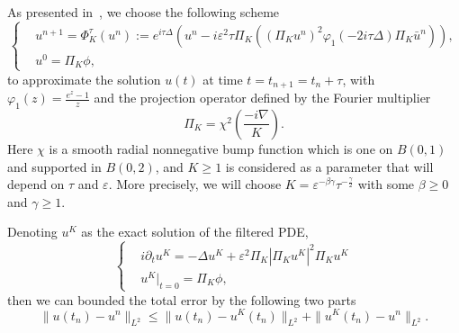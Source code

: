 \documentclass[10pt,a4paper]{article}
\begin{document}
  As presented in~\cite{ORS21}, we choose the following scheme
  \begin{equation}\label{num-sol} %
    \left\{
    \begin{aligned}
      & u^{n+1} = \Phi_K^{\tau}(u^n) := e^{i\tau\Delta} \left( u^n -
      i\varepsilon^2 \tau \Pi_K
      \left( {(\Pi_K u^n)}^2 \varphi_1(-2i\tau\Delta)\Pi_K \bar{u}^n \right) \right), \\
      & u^0 = \Pi_K \phi,
    \end{aligned}
    \right.
  \end{equation}
  to approximate the solution \(u(t)\) at time \( t = t_{n+1} = t_n + \tau \),
  with \( \varphi_1(z) = \frac{e^z-1}{z} \) and the projection operator defined
  by the Fourier multiplier
  \begin{equation}
    \Pi_K = \chi^2 \left( \frac{-i\nabla}{K} \right).
  \end{equation}
  Here \(\chi\) is a smooth radial nonnegative bump function which is one on \(
  B(0,1) \) and supported in \( B(0,2) \), and \( K \geq 1 \) is considered as a
  parameter that will depend on \(\tau\) and \(\varepsilon\). More precisely, we will choose \( K =
  \varepsilon^{-\beta\gamma}\tau^{-\frac\gamma2} \) with some \(\beta \geq 0\) and 
  \(\gamma \geq 1\).  %

  Denoting \(u^K\) as the exact solution of the filtered PDE,
  \begin{equation}\label{nls-fil} %
    \left\{
    \begin{aligned}
      & i\partial_t u^K = -\Delta u^K + \varepsilon^2 \Pi_K|\Pi_K u^K|^2 \Pi_K u^K \\
      & u^K|_{t=0} = \Pi_K\phi,
    \end{aligned}
    \right.
  \end{equation}
  then we can bounded the total error by the following two parts
  \begin{equation}\label{seperr}
    \| u(t_n) - u^n \|_{L^2} \leq \| u(t_n) - u^K(t_n) \|_{L^2} + 
    \| u^K(t_n) - u^n \|_{L^2}.
  \end{equation}

  
\end{document}
